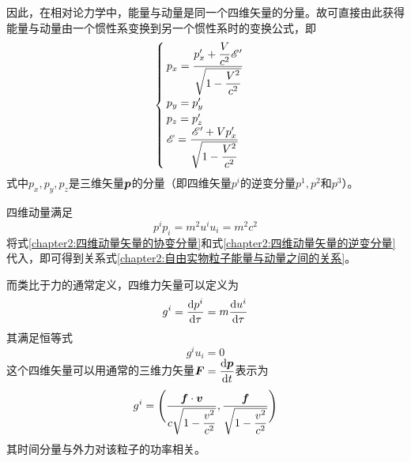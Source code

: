 因此，在相对论力学中，能量与动量是同一个四维矢量的分量。故可直接由此获得能量与动量由一个惯性系变换到另一个惯性系时的变换公式，即
\begin{equation}
\begin{cases}
	\displaystyle p_x = \frac{p'_x+\dfrac{V}{c^2}\mathscr{E}'}{\sqrt{1-\dfrac{V^2}{c^2}}} \\
	p_y = p'_y \\
	p_z = p'_z \\
	\displaystyle \mathscr{E} = \frac{\mathscr{E}'+Vp'_x}{\sqrt{1-\dfrac{V^2}{c^2}}}
\end{cases}
\label{chapter2:惯性系能量动量变换关系式}
\end{equation}
式中$p_x, p_y, p_z$是三维矢量$\boldsymbol{p}$的分量（即四维矢量$p^i$的逆变分量$p^1, p^2$和$p^3$）。

四维动量满足
\begin{equation}
	p^ip_i = m^2u^iu_i = m^2c^2
	\label{chapter2:四维动量的平方}
\end{equation}
将式\eqref{chapter2:四维动量矢量的协变分量}和式\eqref{chapter2:四维动量矢量的逆变分量}代入，即可得到关系式\eqref{chapter2:自由实物粒子能量与动量之间的关系}。

而类比于力的通常定义，四维力矢量可以定义为
\begin{equation}
	g^i = \frac{\mathrm{d} p^i}{\mathrm{d} \tau} = m\frac{\mathrm{d} u^i}{\mathrm{d} \tau}
	\label{chapter2:四维力矢量}
\end{equation}
其满足恒等式
\begin{equation}
	g^i u_i = 0
\end{equation}
这个四维矢量可以用通常的三维力矢量$\boldsymbol{F} = \dfrac{\mathrm{d} \boldsymbol{p}}{\mathrm{d} t}$表示为
\begin{equation}
	g^i = \Bigg(\frac{\boldsymbol{f}\cdot\boldsymbol{v}}{c\sqrt{1-\dfrac{v^2}{c^2}}}, \frac{\boldsymbol{f}}{\sqrt{1-\dfrac{v^2}{c^2}}}\Bigg)
\end{equation}
其时间分量与外力对该粒子的功率相关。

